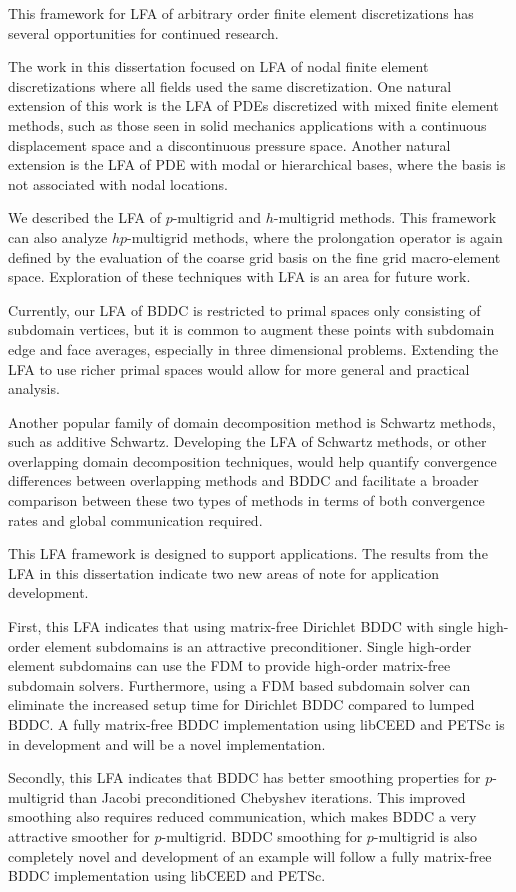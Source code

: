 This framework for LFA of arbitrary order finite element discretizations has several opportunities for continued research.

The work in this dissertation focused on LFA of nodal finite element discretizations where all fields used the same discretization.
One natural extension of this work is the LFA of PDEs discretized with mixed finite element methods, such as those seen in solid mechanics applications with a continuous displacement space and a discontinuous pressure space.
Another natural extension is the LFA of PDE with modal or hierarchical bases, where the basis is not associated with nodal locations.

We described the LFA of $p$-multigrid and $h$-multigrid methods.
This framework can also analyze $hp$-multigrid methods, where the prolongation operator is again defined by the evaluation of the coarse grid basis on the fine grid macro-element space.
Exploration of these techniques with LFA is an area for future work.

Currently, our LFA of BDDC is restricted to primal spaces only consisting of subdomain vertices, but it is common to augment these points with subdomain edge and face averages, especially in three dimensional problems.
Extending the LFA to use richer primal spaces would allow for more general and practical analysis.

Another popular family of domain decomposition method is Schwartz methods, such as additive Schwartz.
Developing the LFA of Schwartz methods, or other overlapping domain decomposition techniques, would help quantify convergence differences between overlapping methods and BDDC and facilitate a broader comparison between these two types of methods in terms of both convergence rates and global communication required.

This LFA framework is designed to support applications.
The results from the LFA in this dissertation indicate two new areas of note for application development.

First, this LFA indicates that using matrix-free Dirichlet BDDC with single high-order element subdomains is an attractive preconditioner.
Single high-order element subdomains can use the FDM to provide high-order matrix-free subdomain solvers.
Furthermore, using a FDM based subdomain solver can eliminate the increased setup time for Dirichlet BDDC compared to lumped BDDC.
A fully matrix-free BDDC implementation using libCEED and PETSc is in development and will be a novel implementation.

Secondly, this LFA indicates that BDDC has better smoothing properties for $p$-multigrid than Jacobi preconditioned Chebyshev iterations.
This improved smoothing also requires reduced communication, which makes BDDC a very attractive smoother for $p$-multigrid.
BDDC smoothing for $p$-multigrid is also completely novel and development of an example will follow a fully matrix-free BDDC implementation using libCEED and PETSc.